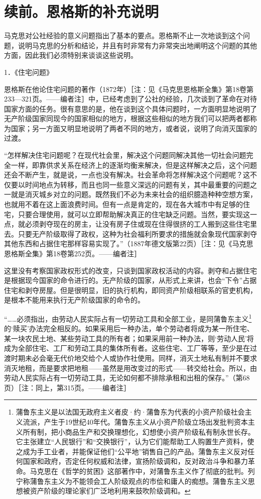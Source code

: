 \documentclass[UTF8, 12pt, a4paper]{ctexrep}
\begin{document}
\chapter{续前。恩格斯的补充说明}

马克思对公社经验的意义问题指出了基本的要点。恩格斯不止一次地谈到这个问题，说明马克思的分析和结论，并且有时非常有力非常突出地阐明这个问题的其他方面，因此我们必须特别来谈谈这些说明。

1．《住宅问题》

恩格斯在他论住宅问题的著作（1872年）［注：见《马克思恩格斯全集》第18卷第233—321页。——编者注］中，已经考虑到了公社的经验，几次谈到了革命在对待国家方面的任务。很有意思的是，他在谈到这个具体问题时，一方面明显地说明了无产阶级国家同现今的国家相似的地方，根据这些相似的地方我们可以把两者都称为国家；另一方面又明显地说明了两者不同的地方，或者说，说明了向消灭国家的过渡。

“怎样解决住宅问题呢？在现代社会里，解决这个问题同解决其他一切社会问题完全一样，即靠供求关系在经济上的逐渐均衡来解决，但是这样解决之后，这个问题还会不断产生，就是说，一点也没有解决。社会革命将怎样解决这个问题呢？这不仅要以时间地点为转移，而且也同一些意义深远的问题有关，其中最重要的问题之一就是消灭城乡对立的问题。既然我们不必为未来社会的组织臆造种种空想方案，也就用不着在这上面浪费时间。但有一点是肯定的，现在各大城市中有足够的住宅，只要合理使用，就可以立即帮助解决真正的住宅缺乏问题。当然，要实现这一点，就必须剥夺现在的房主，让没有房子住或现在住得很挤的工人搬到这些住宅里去。只要无产阶级取得了政权，这种为社会福利所要求的措施就会象现代国家剥夺其他东西和占据住宅那样容易实现了。”（1887年德文版第22页）［注：见《马克思恩格斯全集》第18卷第252页。——编者注］

这里没有考察国家政权形式的改变，只谈到国家政权活动的内容。剥夺和占据住宅是根据现今国家的命令进行的。无产阶级的国家，从形式上来讲，也会“下令”占据住宅和剥夺房屋。但是很明显，旧的执行机构，即同资产阶级相联系的官吏机构，是根本不能用来执行无产阶级国家的命令的。

“……必须指出，由劳动人民实际占有一切劳动工具和全部工业，是同蒲鲁东主义\footnote{蒲鲁东主义是以法国无政府主义者皮·约·蒲鲁东为代表的小资产阶级社会主义流派，产生于19世纪40年代。蒲鲁东主义从小资产阶级立场出发批判资本主义所有制，把小商品生产和交换理想化，幻想使小资产阶级私有制永世长存。它主张建立“人民银行”和“交换银行”，认为它们能帮助工人购置生产资料，使之成为手工业者，并能保证他们“公平地”销售自己的产品。蒲鲁东主义反对任何国家和政府，否定任何权威和法律，宣扬阶级调和，反对政治斗争和暴力革命。马克思在《哲学的贫困》这部著作中，对蒲鲁东主义作了彻底的批判。列宁称蒲鲁东主义为不能领会工人阶级观点的市侩和庸人的痴想。蒲鲁东主义思想被资产阶级的理论家们广泛地利用来鼓吹阶级调和。}的‘赎买’办法完全相反的。如果采用后一种办法，单个劳动者将成为某一所住宅、某一块农民土地、某些劳动工具的所有者；如果采用前一种办法，则‘劳动人民’将成为全部住宅、工厂和劳动工具的集体所有者。这些住宅、工厂等等，至少是在过渡时期未必会毫无代价地交给个人或协作社使用。同样，消灭土地私有制并不要求消灭地租，而是要求把地租——虽然是用改变过的形式——转交给社会。所以，由劳动人民实际占有一切劳动工具，无论如何都不排除承租和出租的保存。”（第68页）［注：同上，第315页。——编者注］
\end{document}
